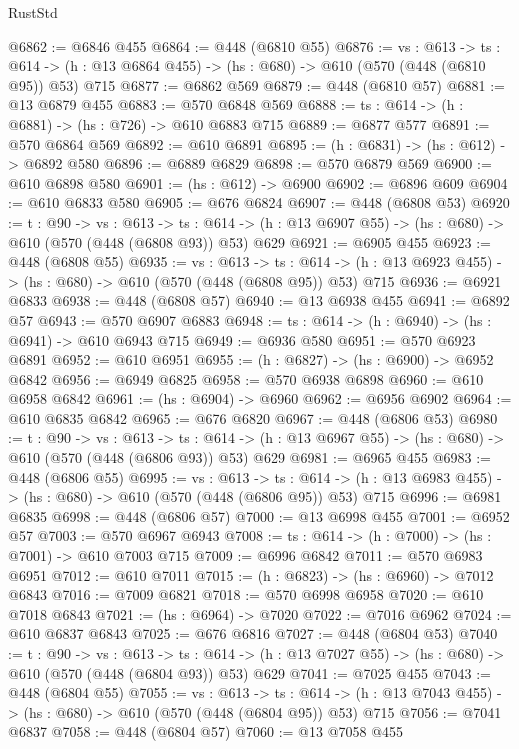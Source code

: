 \begin{lexlean}{RustStd}
\begin{coremodule}
@6862 := @6846 @455
@6864 := @448 (@6810 @55)
@6876 := {vs : @613} ->
  {ts : @614} -> (h : @13 @6864 @455) -> (hs : @680) -> @610 (@570 (@448 (@6810 @95)) @53) @715
@6877 := @6862 @569
@6879 := @448 (@6810 @57)
@6881 := @13 @6879 @455
@6883 := @570 @6848 @569
@6888 := {ts : @614} -> (h : @6881) -> (hs : @726) -> @610 @6883 @715
@6889 := @6877 @577
@6891 := @570 @6864 @569
@6892 := @610 @6891
@6895 := (h : @6831) -> (hs : @612) -> @6892 @580
@6896 := @6889 @6829
@6898 := @570 @6879 @569
@6900 := @610 @6898 @580
@6901 := (hs : @612) -> @6900
@6902 := @6896 @609
@6904 := @610 @6833 @580
@6905 := @676 @6824
@6907 := @448 (@6808 @53)
@6920 := {t : @90} ->
  {vs : @613} ->
  {ts : @614} -> (h : @13 @6907 @55) -> (hs : @680) -> @610 (@570 (@448 (@6808 @93)) @53) @629
@6921 := @6905 @455
@6923 := @448 (@6808 @55)
@6935 := {vs : @613} ->
  {ts : @614} -> (h : @13 @6923 @455) -> (hs : @680) -> @610 (@570 (@448 (@6808 @95)) @53) @715
@6936 := @6921 @6833
@6938 := @448 (@6808 @57)
@6940 := @13 @6938 @455
@6941 := @6892 @57
@6943 := @570 @6907 @6883
@6948 := {ts : @614} -> (h : @6940) -> (hs : @6941) -> @610 @6943 @715
@6949 := @6936 @580
@6951 := @570 @6923 @6891
@6952 := @610 @6951
@6955 := (h : @6827) -> (hs : @6900) -> @6952 @6842
@6956 := @6949 @6825
@6958 := @570 @6938 @6898
@6960 := @610 @6958 @6842
@6961 := (hs : @6904) -> @6960
@6962 := @6956 @6902
@6964 := @610 @6835 @6842
@6965 := @676 @6820
@6967 := @448 (@6806 @53)
@6980 := {t : @90} ->
  {vs : @613} ->
  {ts : @614} -> (h : @13 @6967 @55) -> (hs : @680) -> @610 (@570 (@448 (@6806 @93)) @53) @629
@6981 := @6965 @455
@6983 := @448 (@6806 @55)
@6995 := {vs : @613} ->
  {ts : @614} -> (h : @13 @6983 @455) -> (hs : @680) -> @610 (@570 (@448 (@6806 @95)) @53) @715
@6996 := @6981 @6835
@6998 := @448 (@6806 @57)
@7000 := @13 @6998 @455
@7001 := @6952 @57
@7003 := @570 @6967 @6943
@7008 := {ts : @614} -> (h : @7000) -> (hs : @7001) -> @610 @7003 @715
@7009 := @6996 @6842
@7011 := @570 @6983 @6951
@7012 := @610 @7011
@7015 := (h : @6823) -> (hs : @6960) -> @7012 @6843
@7016 := @7009 @6821
@7018 := @570 @6998 @6958
@7020 := @610 @7018 @6843
@7021 := (hs : @6964) -> @7020
@7022 := @7016 @6962
@7024 := @610 @6837 @6843
@7025 := @676 @6816
@7027 := @448 (@6804 @53)
@7040 := {t : @90} ->
  {vs : @613} ->
  {ts : @614} -> (h : @13 @7027 @55) -> (hs : @680) -> @610 (@570 (@448 (@6804 @93)) @53) @629
@7041 := @7025 @455
@7043 := @448 (@6804 @55)
@7055 := {vs : @613} ->
  {ts : @614} -> (h : @13 @7043 @455) -> (hs : @680) -> @610 (@570 (@448 (@6804 @95)) @53) @715
@7056 := @7041 @6837
@7058 := @448 (@6804 @57)
@7060 := @13 @7058 @455

\end{coremodule}
\end{lexlean}

